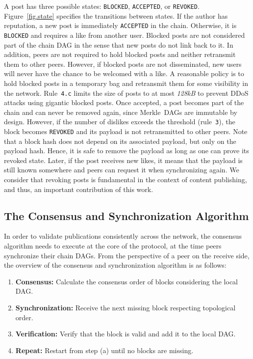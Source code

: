 \documentclass[10pt,journal,compsoc]{IEEEtran}
\newcommand{\code}[1]  {\texttt{\footnotesize{#1}}}
\begin{document}
A post has three possible states: \code{BLOCKED}, \code{ACCEPTED}, or
\code{REVOKED}.
Figure~\ref{fig.state} specifies the transitions between states.
%
If the author has reputation, a new post is immediately \code{ACCEPTED} in the
chain.
%
Otherwise, it is \code{BLOCKED} and requires a like from another user.
Blocked posts are not considered part of the chain DAG in the sense that new
posts do not link back to it.
In addition, peers are not required to hold blocked posts and neither
retransmit them to other peers.
However, if blocked posts are not disseminated, new users will never have the
chance to be welcomed with a like.
A reasonable policy is to hold blocked posts in a temporary bag and retransmit
them for some visibility in the network.
Rule~\code{4.c} limits the size of posts to at most \emph{128kB} to prevent
DDoS attacks using gigantic blocked posts.
%
Once accepted, a post becomes part of the chain and can never be removed
again, since Merkle~DAGs are immutable by design.
%
However, if the number of dislikes exceeds the threshold (rule~\code{3}), the
block becomes \code{REVOKED} and its payload is not retransmitted to other
peers.
Note that a block hash does not depend on its associated payload, but only on
the payload hash.
Hence, it is safe to remove the payload as long as one can prove its revoked
state.
Later, if the post receives new likes, it means that the payload is still known
somewhere and peers can request it when synchronizing again.
We consider that revoking posts is fundamental in the context of content
publishing, and thus, an important contribution of this work.

\subsection{The Consensus and Synchronization Algorithm}
\label{sec.consensus.algo}

In order to validate publications consistently across the network, the
consensus algorithm needs to execute at the core of the protocol, at the time
peers synchronize their chain DAGs.
From the perspective of a peer on the receive side, the overview of the
consensus and synchronization algorithm is as follows:
\begin{enumerate}
\item \textbf{Consensus:}
    Calculate the consensus order of blocks considering the local DAG.
\item \textbf{Synchronization:}
    Receive the next missing block respecting topological order.
\item \textbf{Verification:}
    Verify that the block is valid and add it to the local DAG.
\item \textbf{Repeat:}
    Restart from step (a) until no blocks are missing.
\end{enumerate}
\end{document}
